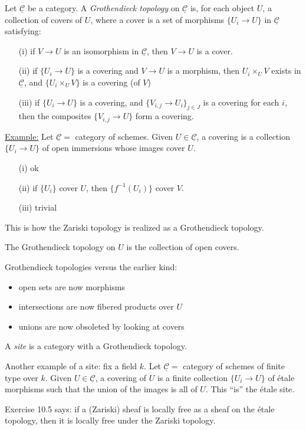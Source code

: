  \def\C{\underline{\mathcal{C}}}

 \begin{definition}
 Let $\C$ be a category.  A \emph{Grothendieck topology} on $\C$
 is, for each object $U$, a collection of covers of $U$, where a
 cover is a set of morphisms $\{U_i\to U\}$ in $\C$ satisfying:
 \begin{itemize}
 \item[(i)] if $V\to U$ is an isomorphism in $\C$, then $V\to U$
 is a cover.
 \item[(ii)] if $\{U_i\to U\}$ is a covering and $V\to U$ is a
 morphism, then $U_i\times_U V$ exists in $\C$, and $\{U_i\times_U
 V\}$ is a covering (of $V$)
 \item[(iii)] if $\{U_i\to U\}$ is a covering, and $\{V_{i,j}\to
 U_i\}_{j\in J}$ is a covering for each $i$, then the composites
 $\{V_{i,j}\to U\}$ form a covering.
 \end{itemize}
 \end{definition}

 \underline{Example:} Let $\C=$ category of schemes.  Given $U\in
 \C$, a covering is a collection $\{U_i\to U\}$ of open immersions
 whose images cover $U$.
 \begin{itemize}
 \item[(i)] ok
 \item[(ii)] if $\{U_i\}$ cover $U$, then $\{f^{-1}(U_i)\}$ cover
 $V$.
 \item[(iii)] trivial
 \end{itemize}

 This is how the Zariski topology is realized as a Grothendieck
 topology.
 \begin{definition}
 The Grothendieck topology on $U$ is the collection of open
 covers.
 \end{definition}
 \begin{remark}
 Grothendieck topologies versus the earlier kind:
 \begin{itemize}
 \item open sets are now morphisms
 \item intersections are now fibered products over $U$
 \item unions are now obsoleted by looking at covers
 \end{itemize}
 \end{remark}

 \begin{definition}
 A \emph{site} is a category with a Grothendieck topology.
 \end{definition}

 Another example of a site: fix a field $k$.  Let $\C=$ category
 of schemes of finite type over $k$.  Given $U\in \C$, a covering
 of $U$ is a finite collection $\{U_i\to U\}$ of \'etale morphisms
 such that the union of the images is all of $U$.  This ``is'' the
 \'etale site.

 Exercise 10.5 says: if a (Zariski) sheaf is locally free as a
 sheaf on the \'etale topology, then it is locally free under the
 Zariski topology.
